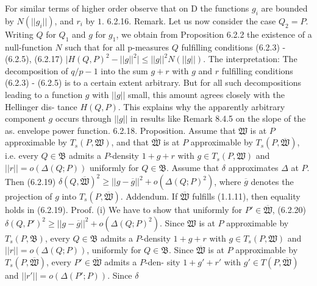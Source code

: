  For similar terms of higher order observe that on D the functions $g_i$ are bounded by $N(||g_i||)$, and $r_i$ by $1$.  6.2.16. Remark. Let us now consider the case $Q_2 = P$. Writing $Q$ for $Q_1$ and $g$ for $g_1$, we obtain from Proposition 6.2.2 the existence of a null-function $N$ such that for all p-measures $Q$ fulfilling conditions (6.2.3) - (6.2.5),  (6.2.17) $\mid H(Q,P)^2 - ||g||^2\mid \leq ||g||^2N(||g||)$.  The interpretation: The decomposition of $q/p - 1$ into the sum $g+r$ with $g$ and $r$ fulfilling conditions (6.2.3) - (6.2.5) is to a certain extent arbitrary. But for all such decompositions leading to a function $g$ with $||g||$ small, this amount agrees closely with the Hellinger dis- tance $H(Q,P)$. This explains why the apparently arbitrary component $g$ occurs through $||g||$ in results like Remark 8.4.5 on the slope of the as. envelope power function.  6.2.18. Proposition. Assume that $\mathfrak{W}$ is at $P$ approximable by $T_s(P,\mathfrak{W})$, and that $\overline{\mathfrak{W}}$ is at $P$ approximable by $T_s(P,\overline{\mathfrak{W}})$, i.e. every $Q\in \mathfrak{B}$ admits a $P$-density $1+g+r$ with $g\in T_s(P,\mathfrak{W})$ and $||r|| = o(\Delta(Q;P))$ uniformly for $Q\in \mathfrak{B}$. Assume that $\delta$ approximates $\Delta$ at $P$. Then (6.2.19) $\delta(Q,\overline{\mathfrak{W}})^2 \geq ||g-\overline{g}||^2 + o(\Delta(Q;P)^2)$, where $\overline{g}$ denotes the projection of $g$ into $T_s(P,\overline{\mathfrak{W}})$.  Addendum. If $\overline{\mathfrak{W}}$ fulfills (1.1.11), then equality holds in (6.2.19).  Proof. (i) We have to show that uniformly for $P'\in \overline{\mathfrak{W}}$, (6.2.20) $\delta(Q,P')^2 \geq ||g-\overline{g}||^2 + o(\Delta(Q;P)^2)$.  Since $\mathfrak{W}$ is at $P$ approximable by $T_s(P,\mathfrak{B})$, every $Q \in \mathfrak{B}$ admits a $P$-density $1+g+r$ with $g\in T_s(P,\mathfrak{W})$ and $||r|| = o(\Delta(Q;P))$, uniformly for $Q\in \mathfrak{B}$. Since $\overline{\mathfrak{W}}$ is at $P$ approximable by $T_s(P,\overline{\mathfrak{W}})$, every $P' \in \overline{\mathfrak{W}}$ admits a $P$-den- sity $1+g'+r'$ with $g'\in T(P,\overline{\mathfrak{W}})$ and $||r'|| = o(\Delta(P';P))$. Since $\delta$ 